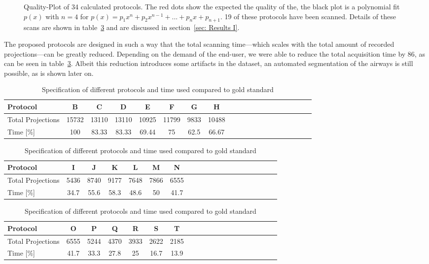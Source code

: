 \begin{figure}
	\centering
		
	\caption{Quality-Plot of 34 calculated protocols. The red dots show the expected the quality of the, the black plot is a polynomial fit $p(x)$ with $n=4$ for $p(x)=p_{1}x^{n}+p_{2}x^{n-1}+...+p_{n}x+p_{n+1}$. 19 of these protocols have been scanned. Details of these scans are shown in table~\ref{tab:projections} and are discussed in section~\ref{sec: Results I}.}
	\label{fig:2008c-qualityplot}
\end{figure}

The proposed protocols are designed in such a way that the total scanning time---which scales with the total amount of recorded projections---can be greatly reduced. Depending on the demand of the end-user, we were able to reduce the total acquisition time by 86\percent, as can be seen in table~\ref{tab:projections}. Albeit this reduction introduces some artifacts in the dataset, an automated segmentation of the airways is still possible, as is shown later on. 

\begin{table}
\centering
	\caption{Specification of different protocols and time used compared to gold standard}
	\begin{tabular*}{\textwidth}{l@{\extracolsep\fill}ccccccccccccccccccc}
		\toprule
		Protocol 			& B & C & D & E & F & G & H\\
		\midrule
		Total Projections 	& 15732 & 13110 & 13110 & 10925 & 11799 & 9833 & 10488\\
		Time [\%] 			& 100 & 83.33 & 83.33 & 69.44 & 75 & 62.5 & 66.67\\
	\end{tabular*}
	\begin{tabular*}{\textwidth}{l@{\extracolsep\fill}ccccccccccccccccccc}
		\toprule
		Protocol 			& I & J & K & L & M & N \\
		\midrule
		Total Projections 	& 5436 & 8740 & 9177 & 7648 & 7866 & 6555 \\
		Time [\%] 			& 34.7 & 55.6 & 58.3 & 48.6 & 50 & 41.7 \\
	\end{tabular*}
	\begin{tabular*}{\textwidth}{l@{\extracolsep\fill}ccccccccccccccccccc}
		\toprule
		Protocol 			& O & P & Q & R & S & T \\
		\midrule
		Total Projections 	& 6555 & 5244 & 4370 & 3933 & 2622 & 2185 \\
		Time [\%] 			& 41.7 & 33.3 & 27.8 & 25 & 16.7 & 13.9 \\
		\bottomrule
	\end{tabular*}
	\label{tab:projections}
\end{table}

